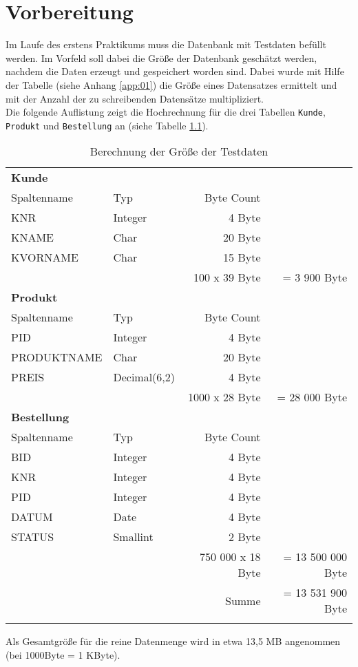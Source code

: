 \chapter{Vorbereitung}
Im Laufe des erstens Praktikums muss die Datenbank mit Testdaten befüllt werden. Im Vorfeld soll dabei die Größe der Datenbank geschätzt werden, nachdem die Daten erzeugt und gespeichert worden sind. 
Dabei wurde mit Hilfe der Tabelle (siehe Anhang \ref{app:01}) die Größe eines Datensatzes ermittelt und mit der Anzahl der zu schreibenden Datensätze multipliziert.\\

Die folgende Auflistung zeigt die Hochrechnung für die drei Tabellen \texttt{Kunde}, \texttt{Produkt} und \texttt{Bestellung} an (siehe Tabelle \ref{tbl:size_of_data}).
\begin{longtable}{|l|l|r|r|} \hline
\multicolumn{4}{|l|}{ \textbf{Kunde}}\\
Spaltenname & Typ & Byte Count & \\
\hline 
KNR & Integer & 4 Byte & \\
KNAME & Char & 20 Byte & \\ 
KVORNAME & Char & 15 Byte &\\ \hline
\multicolumn{2}{|r}{} & 100 x 39 Byte & = 3 900 Byte \\ \hline

\multicolumn{4}{|l|}{ \textbf{Produkt}}\\
Spaltenname & Typ & Byte Count &\\
\hline 
PID & Integer & 4 Byte & \\
PRODUKTNAME & Char & 20 Byte & \\ 
PREIS & Decimal(6,2) & 4 Byte & \\ \hline
\multicolumn{2}{|r}{} & 1000 x 28 Byte & = 28 000 Byte \\ \hline

\multicolumn{4}{|l|}{ \textbf{Bestellung}}\\
Spaltenname & Typ & Byte Count &\\ \hline 
BID & Integer & 4 Byte & \\
KNR & Integer & 4 Byte & \\ 
PID & Integer & 4 Byte & \\ 
DATUM & Date & 4 Byte & \\ 
STATUS & Smallint & 2 Byte & \\ \hline
\multicolumn{2}{|r}{} & 750 000 x 18 Byte & = 13 500 000 Byte \\ \hline
\multicolumn{3}{|r}{Summe} & = 13 531 900 Byte \\ \hline
\caption{Berechnung der Größe der Testdaten}
\label{tbl:size_of_data}
\end{longtable}
Als Gesamtgröße für die reine Datenmenge wird in etwa 13,5 MB angenommen (bei 1000Byte = 1 KByte). 

